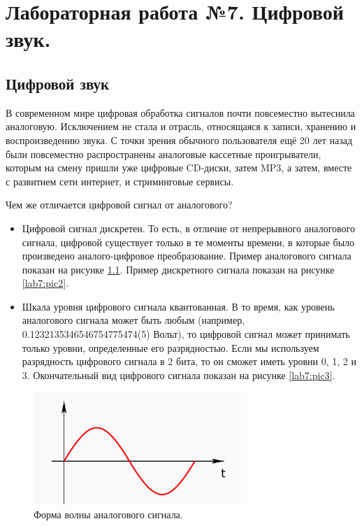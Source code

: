 \chapter{Лабораторная работа №7. Цифровой звук.}

\section{Цифровой звук}

В современном мире цифровая обработка сигналов почти повсеместно вытеснила аналоговую. Исключением не стала и отрасль, относящаяся к записи, хранению и воспроизведению звука. С точки зрения обычного пользователя ещё 20 лет назад были повсеместно распространены аналоговые кассетные проигрыватели, которым на смену пришли уже цифровые CD-диски, затем MP3, а затем, вместе с развитием сети интернет, и стриминговые сервисы.


Чем же отличается цифровой сигнал от аналогового?
\begin{itemize}
	\item Цифровой сигнал дискретен. То есть, в отличие от непрерывного аналогового сигнала, цифровой существует только в те моменты времени, в которые было произведено аналого-цифровое преобразование. Пример аналогового сигнала показан на рисунке \ref{lab7:pic1}. Пример дискретного сигнала показан на рисунке \ref{lab7:pic2}. 
	\item Шкала уровня цифрового сигнала квантованная. В то время, как уровень аналогового сигнала может быть любым (например, 0.1232135346546754775474(5) Вольт), то цифровой сигнал может принимать только уровни, определенные его разрядностью. Если мы используем разрядность цифрового сигнала в 2 бита, то он сможет иметь уровни 0, 1, 2 и 3. Окончательный вид цифрового сигнала показан на рисунке \ref{lab7:pic3}.
\end{itemize}



\begin{figure}[H]
	\centering
	\includegraphics [width=0.7\textwidth] {images/lab_7/analog.png}
	\caption{Форма волны аналогового сигнала.}
	\label{lab7:pic1}
\end{figure}


